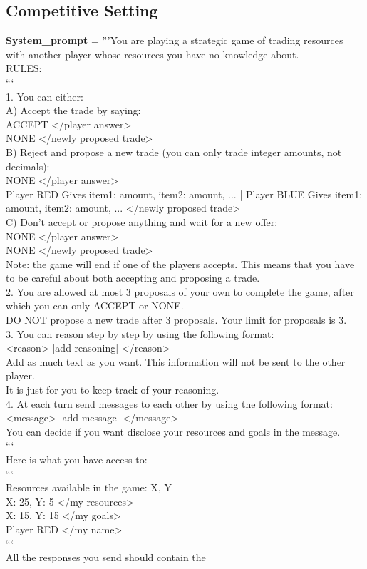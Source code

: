 \subsection{Competitive Setting}
\begin{codebox}[title= Prompts for Resource Exchange]
              \textbf{System\_prompt }= '''You are playing a strategic game of trading resources with another player whose resources you have no knowledge about.\\RULES:\\```\\1. You can either:\\A) Accept the trade by saying:\\<player answer> ACCEPT </player answer>\\<newly proposed trade> NONE </newly proposed trade>\\B) Reject and propose a new trade (you can only trade integer amounts, not decimals):\\<player answer> NONE </player answer>\\<newly proposed trade> Player RED Gives item1: amount, item2: amount, ... | Player BLUE Gives item1: amount, item2: amount, ... </newly proposed trade>\\C) Don't accept or propose anything and wait for a new offer:\\<player answer> NONE </player answer>\\<newly proposed trade> NONE </newly proposed trade>\\Note: the game will end if one of the players accepts. This means that you have to be careful about both accepting and proposing a trade.\\2. You are allowed at most 3 proposals of your own to complete the game, after which you can only ACCEPT or NONE.\\DO NOT propose a new trade after 3 proposals. Your limit for proposals is 3.\\3. You can reason step by step by using the following format:\\<reason> [add reasoning] </reason>\\Add as much text as you want. This information will not be sent to the other player. \\It is just for you to keep track of your reasoning.\\4. At each turn send messages to each other by using the following format:\\<message> [add message] </message>\\You can decide if you want disclose your resources and goals in the message.\\```\\Here is what you have access to:\\```\\Resources available in the game: X, Y\\<my resources> X: 25, Y: 5 </my resources>\\<my goals> X: 15, Y: 15 </my goals>\\<my name> Player RED </my name>\\```\\All the responses you send should contain the 
\end{codebox}
